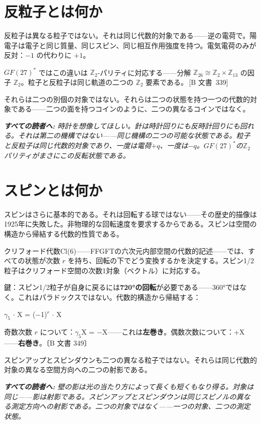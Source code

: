 \documentclass[11pt,openany]{book}
\newcommand{\status}[1]{\penalty10000\,{\tiny\textcolor{gray!70}{[#1]}}}
\newenvironment{laierspur}{%
  \par\vspace{4pt}%
  \noindent\small\itshape\color{blue!60!black}%
  \textbf{すべての読者へ:}\enspace\ignorespaces}{%
  \par\vspace{4pt}\normalsize\normalfont\normalcolor}
\begin{document}
\section*{反粒子とは何か}

反粒子は異なる粒子ではない。それは同じ代数的対象である——逆の電荷で。陽電子は電子と同じ質量、同じスピン、同じ相互作用強度を持つ。電気電荷のみが反対：$-1$ の代わりに $+1$。

$GF(27)^*$ ではこの違いは $\mathbb{Z}_2$-パリティに対応する——分解 $\mathbb{Z}_{26} \cong \mathbb{Z}_2 \times \mathbb{Z}_{13}$ の因子 $\mathbb{Z}_2$。粒子と反粒子は同じ軌道の二つの $\mathbb{Z}_2$ 要素である。\status{B 文書~339}

それらは二つの別個の対象ではない。それらは二つの状態を持つ一つの代数的対象である——二つの面を持つコインのように、二つの異なるコインではなく。

\begin{laierspur}
時計を想像してほしい。針は時計回りにも反時計回りにも回れる。それは第二の機構ではない——同じ機構の二つの可能な状態である。粒子と反粒子は同じ代数的対象であり、一度は電荷$+q$、一度は$-q$。$GF(27)^*$の$\mathbb{Z}_2$パリティがまさにこの反転状態である。
\end{laierspur}

\section*{スピンとは何か}

スピンはさらに基本的である。それは回転する球ではない——その歴史的描像は1925年に失敗した。非物理的な回転速度を要求するからである。スピンは空間の構造から帰結する代数的性質である。

クリフォード代数Cl(6)——FFGFTの六次元内部空間の代数的記述——では、すべての状態が次数 $r$ を持ち、回転の下でどう変換するかを決定する。スピン1/2粒子はクリフォード空間の次数1対象（ベクトル）に対応する。

鍵：スピン1/2粒子が自身に戻るには\textbf{720°の回転}が必要である——360°ではなく。これはパラドックスではない。代数的構造から帰結する：

$\gamma_5$ $\cdot$ X = ($-$1)$^r$ $\cdot$ X

奇数次数 $r$ について：$\gamma_5$X = $-$X——これは\textbf{左巻き}。偶数次数について：+X——\textbf{右巻き}。〔B 文書 349〕

スピンアップとスピンダウンも二つの異なる粒子ではない。それらは同じ代数的対象の異なる空間方向への二つの射影である。

\begin{laierspur}
壁の影は光の当たり方によって長くも短くもなり得る。対象は同じ——影は射影である。スピンアップとスピンダウンは同じスピノルの異なる測定方向への射影である。二つの対象ではなく——一つの対象、二つの測定状態。
\end{laierspur}
\end{document}
